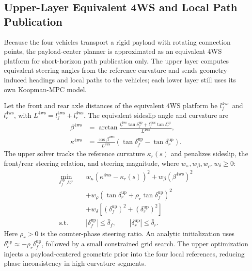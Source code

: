 \documentclass[letterpaper,journal]{IEEEtran}
\begin{document}
\subsection{Upper-Layer Equivalent 4WS and Local Path Publication}

Because the four vehicles transport a rigid payload with rotating connection points, the payload-center planner is approximated as an equivalent 4WS platform for short-horizon path publication only. The upper layer computes equivalent steering angles from the reference curvature and sends geometry-induced headings and local paths to the vehicles; each lower layer still uses its own Koopman-MPC model.

Let the front and rear axle distances of the equivalent 4WS platform be $l_f^{\mathrm{4ws}}$ and $l_r^{\mathrm{4ws}}$, with $L^{\mathrm{4ws}}=l_f^{\mathrm{4ws}}+l_r^{\mathrm{4ws}}$. The equivalent sideslip angle and curvature are
\begin{equation}
\begin{aligned}
\beta^{\mathrm{4ws}} &=
\arctan\frac{l_r^{\mathrm{4ws}}\tan\delta_f^{\mathrm{up}}+l_f^{\mathrm{4ws}}\tan\delta_r^{\mathrm{up}}}{L^{\mathrm{4ws}}},\\
\kappa^{\mathrm{4ws}} &=
\frac{\cos\beta^{\mathrm{4ws}}}{L^{\mathrm{4ws}}}
\left(\tan\delta_f^{\mathrm{up}}-\tan\delta_r^{\mathrm{up}}\right).
\end{aligned}
\label{eq:fourws_beta_curvature}
\end{equation}
The upper solver tracks the reference curvature $\kappa_r(s)$ and penalizes sideslip, the front/rear steering relation, and steering magnitude, where $w_\kappa,w_\beta,w_\rho,w_\delta\ge0$:
\begingroup\small
\begin{equation}
\begin{aligned}
\min_{\delta_f^{\mathrm{up}},\delta_r^{\mathrm{up}}}\quad
&w_\kappa\left(\kappa^{\mathrm{4ws}}-\kappa_r(s)\right)^2
+w_\beta\left(\beta^{\mathrm{4ws}}\right)^2\\
&+w_\rho\left(\tan\delta_r^{\mathrm{up}}
+\rho_r\tan\delta_f^{\mathrm{up}}\right)^2\\
&+w_\delta\left[
\left(\delta_f^{\mathrm{up}}\right)^2
+\left(\delta_r^{\mathrm{up}}\right)^2\right]\\
\mathrm{s.t.}\quad
&|\delta_f^{\mathrm{up}}|\le \bar\delta_f,\qquad
|\delta_r^{\mathrm{up}}|\le \bar\delta_r .
\end{aligned}
\label{eq:fourws_upper_opt}
\end{equation}
\endgroup
Here $\rho_r>0$ is the counter-phase steering ratio. An analytic initialization uses $\delta_r^{\mathrm{up}}\approx-\rho_r\delta_f^{\mathrm{up}}$, followed by a small constrained grid search. The upper optimization injects a payload-centered geometric prior into the four local references, reducing phase inconsistency in high-curvature segments.
\end{document}
